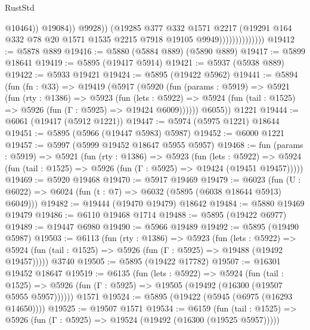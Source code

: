 \begin{lexlean}{RustStd}
\begin{coremodule}
{{                                        @10464))
                                    @19084))
                                @9928))
                            (@19285
                              @377
                              @332
                              @1571
                              @2217
                              (@19291
                                @164
                                @332
                                @78
                                @20
                                @1571
                                @1535
                                @2215
                                @7918
                                @19105
                                @9949))))))))))))))
@19412 := @5878 @889
@19416 := @5880 (@5884 @889) (@5890 @889)
@19417 := @5899 @18641
@19419 := @5895 (@19417 @5914)
@19421 := @5937 (@5938 @889)
@19422 := @5933 @19421
@19424 := @5895 (@19422 @5962)
@19441 := @5894
    (fun (fn : @33) =>
    @19419
      (@5917
        (@5920
          (fun (params : @5919) =>
          @5921
            (fun (rty : @1386) =>
            @5923
              (fun (lets : @5922) =>
              @5924 (fun (tail : @1525) => @5926 (fun (Γ : @5925) => @19424 @6009))))))
        @6055))
    @1221
@19444 := @6061 (@19417 (@5912 @1221))
@19447 := @5974 (@5975 @1221) @18644
@19451 := @5895 (@5966 (@19447 @5983) @5987)
@19452 := @6000 @1221
@19457 := @5997 (@5999 @19452 @18647 @5955 @5957)
@19468 := fun (params : @5919) =>
  @5921
    (fun (rty : @1386) =>
    @5923
      (fun (lets : @5922) =>
      @5924 (fun (tail : @1525) => @5926 (fun (Γ : @5925) => @19424 (@19451 @19457)))))
@19469 := @5920 @19468
@19470 := @5917 @19469
@19479 := @6023
    (fun (U : @6022) => @6024 (fun (t : @7) => @6032 (@5895 (@6038 @18644 @5913) @6049)))
@19482 := @19444 (@19470 @19479) @18642
@19484 := @5880 @19469 @19479
@19486 := @6110 @19468 @1714
@19488 := @5895 (@19422 @6977)
@19489 := @19447 @6980
@19490 := @5966 @19489
@19492 := @5895 (@19490 @5987)
@19503 := @6113
    (fun (rty : @1386) =>
    @5923
      (fun (lets : @5922) =>
      @5924 (fun (tail : @1525) => @5926 (fun (Γ : @5925) => @19488 (@19492 @19457)))))
    @3740
@19505 := @5895 (@19422 @17782)
@19507 := @16301 @19452 @18647
@19519 := @6135
    (fun (lets : @5922) =>
    @5924
      (fun (tail : @1525) =>
      @5926 (fun (Γ : @5925) => @19505 (@19492 (@16300 (@19507 @5955 @5957))))))
    @1571
@19524 := @5895 (@19422 (@5945 (@6975 (@16293 @14650))))
@19525 := @19507 @1571
@19534 := @6159
    (fun (tail : @1525) => @5926 (fun (Γ : @5925) => @19524 (@19492 (@16300 (@19525 @5957)))))
}}
\end{coremodule}
\end{lexlean}
